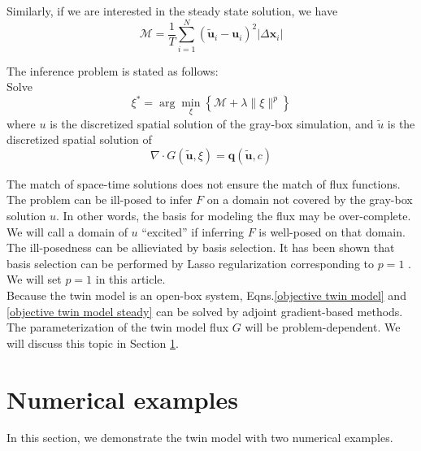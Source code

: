 \documentclass{paper1}
\begin{document}

Similarly, if we are interested in the steady state solution,
we have
\begin{equation}
    \mathcal{M} = \frac{1}{T}
    \sum_{i=1}^{N} \left(\tilde{\boldsymbol{u}}_{i} - \boldsymbol{u}_{i}\right)^2
    \left| \Delta \mathbf{x}_i \right|
    \label{minimizer twin model discrete steady}
\end{equation}

The inference problem is stated as follows:\\

Solve
\begin{equation}
    \xi^* = 
    \arg\min_{\xi} \left\{
    \mathcal{M} 
    + \lambda \|\xi\|^p  \right\}
    \label{objective twin model steady}
\end{equation}
where $u$ is the discretized spatial solution of the gray-box simulation, and $\tilde{u}$
is the discretized spatial solution of
\begin{equation}
    \nabla \cdot
    G(\tilde{\boldsymbol{u}}, \xi)
    = \boldsymbol{q}(\tilde{\boldsymbol{u}},c)
    \label{first equation 2 steady}
\end{equation}

The match of space-time solutions does not ensure the match of flux functions.
The problem can be ill-posed to infer $F$ on a domain not covered by the gray-box solution $u$.
In other words, the basis for modeling the flux may be over-complete.
We will call a domain of $u$ ``excited'' if inferring $F$ is well-posed on that domain.
The ill-posedness
can be allieviated by basis selection. It has been shown that basis selection can be performed
by Lasso regularization corresponding to $p=1$ \cite{Lasso variable selection}.
We will set $p=1$ in this article. \\

Because the twin model is an open-box system, Eqns.\eqref{objective twin model} 
and \eqref{objective twin model steady} can be solved by adjoint gradient-based methods.
The parameterization of the twin model flux $G$ will be problem-dependent. We will discuss
this topic in Section \ref{numerical example}.

\section{Numerical examples}
\label{numerical example}
In this section, we demonstrate the twin model with two numerical examples.
\end{document}
